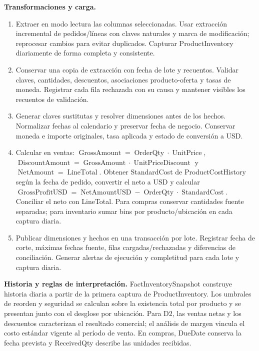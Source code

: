 \documentclass[10pt,a4paper]{article}
\begin{document}
\textbf{Transformaciones y carga.}
\begin{enumerate}
  \item Extraer en modo lectura las columnas seleccionadas. Usar extracción
  incremental de pedidos/líneas con claves naturales y marca de modificación;
  reprocesar cambios para evitar duplicados. Capturar ProductInventory
  diariamente de forma completa y consistente.
  \item Conservar una copia de extracción con fecha de lote y recuentos.
  Validar claves, cantidades, descuentos, asociaciones producto-oferta y
  tasas de moneda. Registrar cada fila rechazada con su causa y mantener
  visibles los recuentos de validación.
  \item Generar claves sustitutas y resolver dimensiones antes de los hechos.
  Normalizar fechas al calendario y preservar fecha de negocio. Conservar
  moneda e importe originales, tasa aplicada y estado de conversión a USD.
  \item Calcular en ventas:
  \(\operatorname{GrossAmount}=\operatorname{OrderQty}\cdot\operatorname{UnitPrice}\),
  \(\operatorname{DiscountAmount}=\operatorname{GrossAmount}\cdot\operatorname{UnitPriceDiscount}\) y
  \(\operatorname{NetAmount}=\operatorname{LineTotal}\). Obtener StandardCost
  de ProductCostHistory según la fecha de pedido, convertir el neto a USD y
  calcular \(\operatorname{GrossProfitUSD}=\operatorname{NetAmountUSD}-
  \operatorname{OrderQty}\cdot\operatorname{StandardCost}\). Conciliar el
  neto con LineTotal. Para compras conservar cantidades fuente separadas;
  para inventario sumar bins por producto/ubicación en cada captura diaria.
  \item Publicar dimensiones y hechos en una transacción por lote. Registrar
  fecha de corte, máximas fechas fuente, filas cargadas/rechazadas y
  diferencias de conciliación. Generar alertas de ejecución y completitud
  para cada lote y captura diaria.
\end{enumerate}

\textbf{Historia y reglas de interpretación.} FactInventorySnapshot construye
historia diaria a partir de la primera captura de ProductInventory. Los
umbrales de reorden y seguridad se calculan sobre la existencia total por
producto y se presentan junto con el desglose por ubicación. Para D2, las
ventas netas y los descuentos caracterizan el resultado comercial; el análisis
de margen vincula el costo estándar vigente al período de venta. En compras,
DueDate conserva la fecha prevista y ReceivedQty describe las unidades
recibidas.
\end{document}
